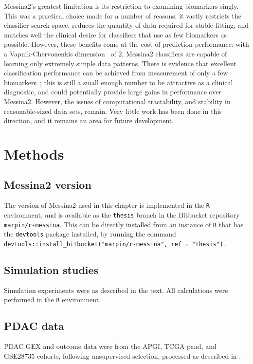 \documentclass[dissertation.tex]{subfiles}
\begin{document}
Messina2's greatest limitation is its restriction to examining biomarkers singly.  This was a practical choice made for a number of reasons: it vastly restricts the classifier search space, reduces the quantity of data required for stable fitting, and matches well the clinical desire for classifiers that use as few biomarkers as possible.  However, these benefits come at the cost of prediction performance: with a Vapnik-Chervonenkis dimension~\cite{Vapnik2000} of 2, Messina2 classifiers are capable of learning only extremely simple data patterns.  There is evidence that excellent classification performance can be achieved from measurement of only a few biomarkers~\cite{Grate2005}; this is still a small enough number to be attractive as a clinical diagnostic, and could potentially provide large gains in performance over Messina2.  However, the issues of computational tractability, and stability in reasonable-sized data sets, remain.  Very little work has been done in this direction, and it remains an area for future development.


\section{Methods}

\subsection{Messina2 version}
The version of Messina2 used in this chapter is implemented in the \texttt{R} environment, and is available as the \texttt{thesis} branch in the Bitbucket repository \texttt{marpin/r-messina}.  This can be directly installed from an instance of \texttt{R} that has the \texttt{devtools} package installed, by running the command \texttt{devtools::install\_bitbucket("marpin/r-messina", ref = "thesis")}.

\subsection{Simulation studies}
Simulation experiments were as described in the text.  All calculations were performed in the \texttt{R} environment.

\subsection{\texorpdfstring{\acrshort{PDAC}}{PDAC} data}
\gls{PDAC} \gls{GEX} and outcome data were from the \gls{APGI}, \gls{TCGA} paad, and GSE28735 cohorts, following unsupervised selection, processed as described in .
\end{document}
